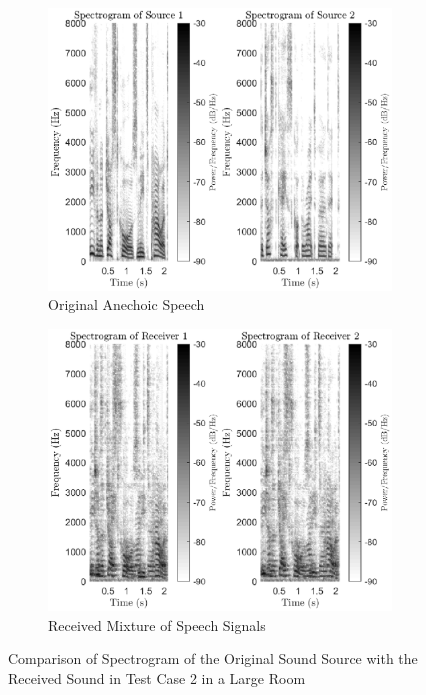\documentclass[a4paper,twoside,12pt,hidelinks]{article}
\begin{document}
\begin{figure}[H]
\centering	
\begin{subfigure}[H]{0.48\textwidth}
\includegraphics[width=\textwidth]{spectsrc}
\caption{Original Anechoic Speech}
\end{subfigure}
\begin{subfigure}[H]{0.48\textwidth}
\includegraphics[width=\textwidth]{spectrec}
\caption{Received Mixture of Speech Signals}
\end{subfigure}
\caption{Comparison of Spectrogram of the Original Sound Source with the Received Sound in Test Case 2 in a Large Room}
\label{fig:spectreceived}
\end{figure}
\end{document}
